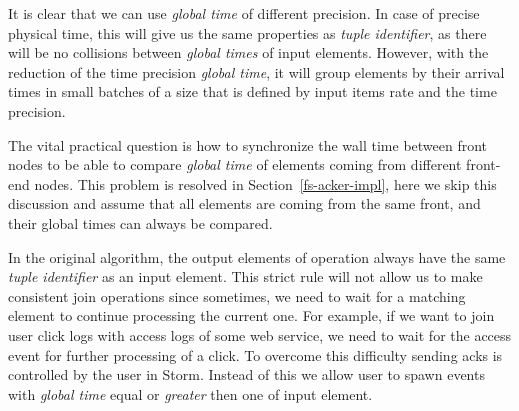 It is clear that we can use \textit{global time} of different precision. In case of precise physical time, this will give us the same properties as \textit{tuple identifier}, as there will be no collisions between \textit{global times} of input elements. However, with the reduction of the time precision \textit{global time}, it will group elements by their arrival times in small batches of a size that is defined by input items rate and the time precision.

The vital practical question is how to synchronize the wall time between front nodes to be able to compare \textit{global time} of elements coming from different front-end nodes. This problem is resolved in Section~\ref{fs-acker-impl}, here we skip this discussion and assume that all elements are coming from the same front, and their global times can always be compared.

In the original algorithm, the output elements of operation always have the same \textit{tuple identifier} as an input element. This strict rule will not allow us to make consistent join operations since sometimes, we need to wait for a matching element to continue processing the current one. For example, if we want to join user click logs with access logs of some web service, we need to wait for the access event for further processing of a click. To overcome this difficulty sending acks is controlled by the user in Storm. Instead of this we allow user to spawn events with \textit{global time} equal or \textit{greater} then one of input element.




